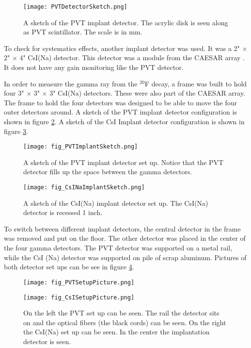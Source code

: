 \documentclass[../MaxHughesThesis.tex]{subfiles}
\begin{document}
\begin{figure}
	\centerline{\texttt{[image: PVTDetectorSketch.png]}}
	\caption{A sketch of the PVT implant detector.
		 The acrylic disk is seen along as PVT scintillator. 
		  The scale is in mm. }
	\label{fig:PVTDetSketch}
\end{figure}
To check for systematics effects, another implant detector was used.
It was a 2" $\times$ 2" $\times$ 4"  CsI(Na) detector. 
This detector was a module from the CAESAR array \cite{Wei10}.
It does not have any gain monitoring like the PVT detector.

In order to measure the gamma ray from the $^{20}$F decay, a frame was built to hold four 3" $\times$ 3" $\times$ 3" CsI(Na) detectors.  
These were also part of the CAESAR array.
The frame to hold the four detectors was designed to be able to move the four outer detectors around.
A sketch of the PVT implant detector configuration is shown in figure \ref{fig:detsketch}.
A sketch of the CsI Implant detector configuration is shown in figure \ref{fig:csiimdetsketch}.

\begin{figure}
		\centerline{\texttt{[image: fig\_PVTImplantSketch.png]}}
		\caption{A sketch of the PVT implant detector set up. 
		 Notice that the PVT detector fills up the space between the gamma detectors.
		 }
	\label{fig:detsketch}
\end{figure}

\begin{figure}
	\centerline{\texttt{[image: fig\_CsINaImplantSketch.png]}}
	\caption{A sketch of the CsI(Na) implant detector set up. 
		    The CsI(Na) detector is recessed 1 inch. 
			}
	\label{fig:csiimdetsketch}
\end{figure}
To switch between different implant detectors, the central detector in the frame was removed and put on the floor.
The other detector was placed in the center of the four gamma detectors.
The PVT detector was supported on a metal rail, while the CsI (Na) detector was supported on pile of scrap aluminum.
Pictures of both detector set ups can be see in figure \ref{fig:PVTPicture}.

\begin{figure}
    \centering
    \begin{minipage}{0.50\textwidth}
	\centerline{\texttt{[image: fig\_PVTSetupPicture.png]}}
    \end{minipage}\hfill
    \begin{minipage}{0.50\textwidth}
	\centerline{\texttt{[image: fig\_CsISetupPicture.png]}}
    \end{minipage}
	\caption{On the left the PVT set up can be seen. 
		 The rail the detector sits on and the optical fibers (the black cords) can be seen.
		 On the right the CsI(Na) set up can be seen.
		 In the center the implantation detector is seen.
		 }
	\label{fig:PVTPicture}
\end{figure}
\end{document}
